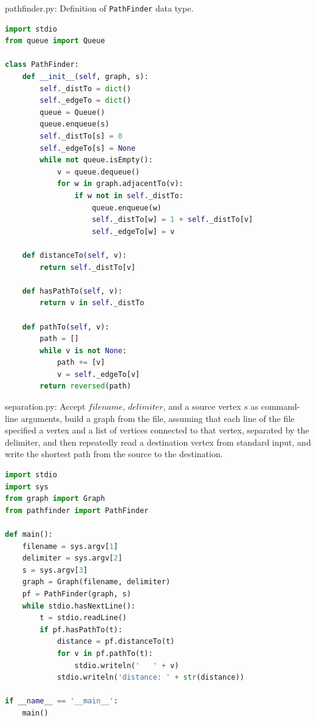 \documentclass[8pt,a4paper,compress]{beamer}
\begin{document}
\begin{frame}[fragile]
\pause

\begin{framed}
\tiny pathfinder.py: Definition of \lstinline{PathFinder} data type.
\end{framed}

\begin{lstlisting}[language=Python]
import stdio
from queue import Queue

class PathFinder:
    def __init__(self, graph, s):
        self._distTo = dict()
        self._edgeTo = dict()
        queue = Queue()
        queue.enqueue(s)
        self._distTo[s] = 0
        self._edgeTo[s] = None
        while not queue.isEmpty():
            v = queue.dequeue()
            for w in graph.adjacentTo(v):
                if w not in self._distTo:
                    queue.enqueue(w)
                    self._distTo[w] = 1 + self._distTo[v]
                    self._edgeTo[w] = v
    
    def distanceTo(self, v):
        return self._distTo[v]
        
    def hasPathTo(self, v):
        return v in self._distTo

    def pathTo(self, v):
        path = []
        while v is not None:
            path += [v]
            v = self._edgeTo[v]
        return reversed(path)
\end{lstlisting}
\end{frame}

\begin{frame}[fragile]
\pause

\begin{framed}
\tiny separation.py: Accept $filename$, $delimiter$, and a source vertex $s$ as command-line arguments, build a graph from the file, assuming that each line of the file specified a vertex and a list of vertices connected to that vertex, separated by the delimiter, and then repeatedly read a destination vertex from standard input, and write the shortest path from the source to the destination.
\end{framed}

\begin{lstlisting}[language=Python]
import stdio
import sys
from graph import Graph
from pathfinder import PathFinder

def main():
    filename = sys.argv[1]
    delimiter = sys.argv[2]
    s = sys.argv[3]
    graph = Graph(filename, delimiter)
    pf = PathFinder(graph, s)
    while stdio.hasNextLine():
        t = stdio.readLine()
        if pf.hasPathTo(t):
            distance = pf.distanceTo(t)
            for v in pf.pathTo(t):
                stdio.writeln('   ' + v)
            stdio.writeln('distance: ' + str(distance))

if __name__ == '__main__':
    main()
\end{lstlisting}
\end{frame}
\end{document}

